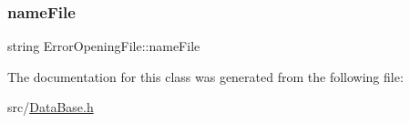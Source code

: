 \subsubsection{\texorpdfstring{name\+File}{nameFile}}
{\footnotesize\ttfamily string Error\+Opening\+File\+::name\+File\hspace{0.3cm}{\ttfamily [private]}}



The documentation for this class was generated from the following file\+:\begin{DoxyCompactItemize}
\item 
src/\hyperlink{DataBase_8h}{Data\+Base.\+h}\end{DoxyCompactItemize}

